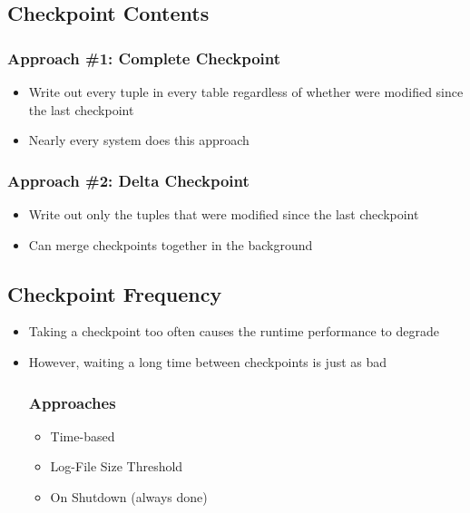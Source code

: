 \documentclass[11pt]{article}
\begin{document}
    \subsection*{Checkpoint Contents}
        \subsubsection*{Approach \#1: Complete Checkpoint}
        \begin{itemize}
            \item Write out every tuple in every table regardless of whether were modified since the last checkpoint
            \item Nearly every system does this approach
        \end{itemize}

        \subsubsection*{Approach \#2: Delta Checkpoint}
        \begin{itemize}
            \item Write out only the tuples that were modified since the last checkpoint
            \item Can merge checkpoints together in the background
        \end{itemize}

    \subsection*{Checkpoint Frequency}
        \begin{itemize}
            \item Taking a checkpoint too often causes the runtime performance to degrade
            \item However, waiting a long time between checkpoints is just as bad
            \subsubsection*{Approaches}
            \begin{itemize}
                \item Time-based
                \item Log-File Size Threshold
                \item On Shutdown (always done)
            \end{itemize}
        \end{itemize}
\end{document}
